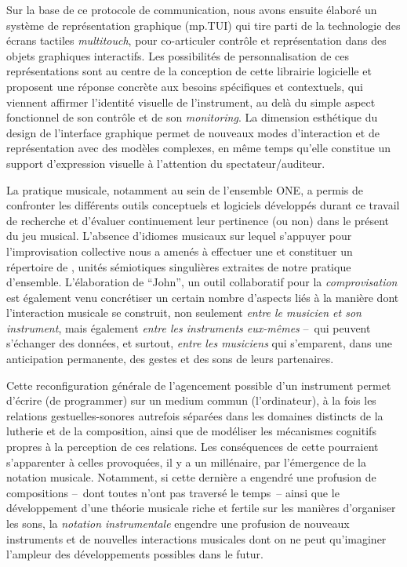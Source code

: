 \noindent Sur la base de ce protocole de communication, nous avons ensuite élaboré un système de représentation graphique (mp.TUI) qui tire parti de la technologie des écrans tactiles \textit{multitouch}, pour co-articuler contrôle et représentation dans des objets graphiques interactifs. Les possibilités de personnalisation de ces représentations sont au centre de la conception de cette librairie logicielle et proposent une réponse concrète aux besoins spécifiques et contextuels, qui viennent affirmer l'identité visuelle de l'instrument, au delà du simple aspect fonctionnel de son contrôle et de son \textit{monitoring}. La dimension esthétique du design de l'interface graphique permet de nouveaux modes d'interaction et de représentation avec des modèles complexes, en même temps qu'elle constitue un support d'expression visuelle à l'attention du spectateur/auditeur.

\noindent La pratique musicale, notamment au sein de l'ensemble ONE, a permis de confronter les différents outils conceptuels et logiciels développés durant ce travail de recherche et d'évaluer continuement leur pertinence (ou non) dans le présent du jeu musical. L'absence d'idiomes musicaux sur lequel s'appuyer pour l'improvisation collective nous a amenés à effectuer une  et constituer un répertoire de , unités sémiotiques singulières extraites de notre pratique d'ensemble. L'élaboration de ``John'', un outil collaboratif pour la \textit{comprovisation} est également venu concrétiser un certain nombre d'aspects liés à la manière dont l'interaction musicale se construit, non seulement \textit{entre le musicien et son instrument}, mais également \textit{entre les instruments eux-mêmes} --~qui peuvent s'échanger des données, et surtout, \textit{entre les musiciens} qui s'emparent, dans une anticipation permanente, des gestes et des sons de leurs partenaires.


\noindent Cette reconfiguration générale de l'agencement possible d'un instrument permet d'écrire (de programmer) sur un medium commun (l'ordinateur), à la fois les relations gestuelles-sonores autrefois séparées dans les domaines distincts de la lutherie et de la composition, ainsi que de modéliser les mécanismes cognitifs propres à la perception de ces relations. Les conséquences de cette  pourraient s'apparenter à celles provoquées, il y a un millénaire, par l'émergence de la notation musicale. Notamment, si cette dernière a engendré une profusion de compositions --~dont toutes n'ont pas traversé le temps~-- ainsi que le développement d'une théorie musicale riche et fertile sur les manières d'organiser les sons, la \textit{notation instrumentale} engendre une profusion de nouveaux instruments et de nouvelles interactions musicales dont on ne peut qu'imaginer l'ampleur des développements possibles dans le futur.

